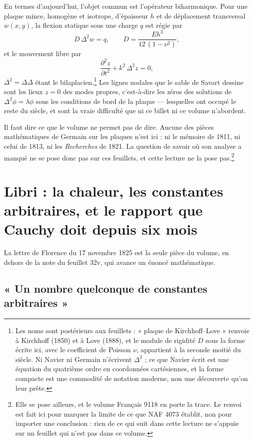 \documentclass[11pt,a4paper]{article}
\begin{document}
En termes d'aujourd'hui, l'objet commun est l'opérateur bi\-harmonique. Pour une
plaque mince, homogène et isotrope, d'épaisseur $h$ et de déplacement
transversal $w(x,y)$, la flexion statique sous une charge $q$ est régie par
\[
D\,\Delta^2 w = q,
\qquad
D = \frac{E h^3}{12\,(1-\nu^2)},
\]
et le mouvement libre par
\[
\frac{\partial^2 z}{\partial t^2} + k^2\,\Delta^2 z = 0 ,
\]
$\Delta^2 = \Delta\Delta$ étant le bilaplacien.\footnote{Les noms sont
postérieurs aux feuillets : « plaque de Kirchhoff--Love » renvoie à Kirchhoff
(1850) et à Love (1888), et le module de rigidité $D$ sous la forme écrite ici,
avec le coefficient de Poisson $\nu$, appartient à la seconde moitié du siècle.
Ni Navier ni Germain n'écrivent $\Delta^2$ ; ce que Navier écrit est une
équation du quatrième ordre en coordonnées cartésiennes, et la forme compacte
est une commodité de notation moderne, non une découverte qu'on leur prête.}
Les lignes nodales que le sable de Savart dessine sont les lieux $z = 0$ des
modes propres, c'est-à-dire les zéros des solutions de $\Delta^2 \phi =
\lambda \phi$ sous les conditions de bord de la plaque --- lesquelles ont
occupé le reste du siècle, et sont la vraie difficulté que ni ce billet ni ce
volume n'abordent.

Il faut dire ce que le volume ne permet pas de dire. Aucune des pièces
mathématiques de Germain sur les plaques n'est ici : ni le mémoire de 1811, ni
celui de 1813, ni les \emph{Recherches} de 1821. La question de savoir où son
analyse a manqué ne se pose donc pas sur ces feuillets, et cette lecture ne la
pose pas.\footnote{Elle se pose ailleurs, et le volume Français 9118 en porte
la trace. Le renvoi est fait ici pour marquer la limite de ce que NAF 4073
établit, non pour importer une conclusion : rien de ce qui suit dans cette
lecture ne s'appuie sur un feuillet qui n'est pas dans ce volume.}

\section*{Libri : la chaleur, les constantes arbitraires, et le rapport que Cauchy doit depuis six mois}

La lettre de Florence du 17 novembre 1825 est la seule pièce du volume, en
dehors de la note du feuillet 32v, qui avance un énoncé mathématique.

\subsection*{« Un nombre quelconque de constantes arbitraires »}
\end{document}
